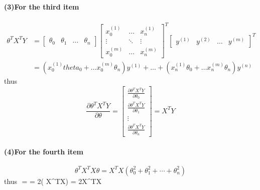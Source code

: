 \documentclass[UTF8]{article}
\begin{document}
\paragraph{(3)For the third item}
\begin{align*}
  \theta^T X^TY &=
  \left[
  \begin{matrix}
    \theta_0 & \theta_1 & \dots & \theta_n
  \end{matrix}
  \right]
  \left[
  \begin{matrix}
      x_0^{(1)} & \dots &x_n^{(1)} \\
      \vdots & \ddots & \vdots \\
      x_0^{(m)} & \dots & x_n^{(m)}
  \end{matrix}
 \right]^T
 \left[
 \begin{matrix}
 y^{(1)} & y^{(2)} & \dots & y^{(m)}
 \end{matrix}
 \right]^T \\
  &= \left(x_0^{(1)}theta_0 + \dots x_0^{(m)}\theta_n \right)y^{(1)}
  + \dots + \left(x_n^{(1)}\theta_0 + \dots x_n^{(m)}\theta_n \right)y^{(n)}
\end{align*}
thus
$$
\frac{\partial \theta^T X^TY}{\partial\theta} = \left[
\begin{matrix}
  \frac{\partial \theta^T X^TY}{\partial\theta_0} \\
  \frac{\partial \theta^T X^TY}{\partial\theta_1} \\
  \vdots \\
  \frac{\partial \theta^T X^TY}{\partial\theta_n}
\end{matrix}
\right] = X^TY
$$

\paragraph{(4)For the fourth item}
$$
\theta^TX^TX\theta = X^TX\left( \theta_0^2 + \theta_1^2 +\cdots + \theta_n^2 \right)
$$
thus
$$
 =  = 2\left( X^TX\right)
\left[
  \begin{matrix}
    \theta_0 \\
    \theta_1 \\
    \vdots \\
    \theta_n
  \end{matrix}}
\right] = 2X^TX\theta
$$
\end{document}
